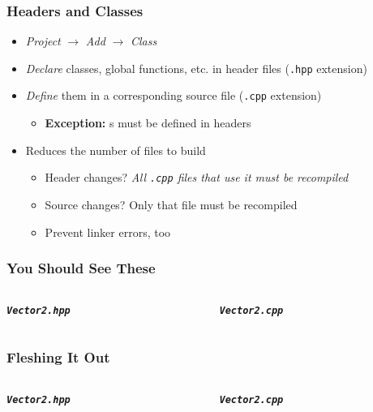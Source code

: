 \documentclass[glossy]{beamer}
\newcommand{\filename}[1]{\texttt{\textbf{\emph{#1}}}}
\begin{document}
\begin{frame}[fragile=singleslide]
  \frametitle{Headers and Classes}

  \begin{itemize}
    \item \emph{Project} $\rightarrow$ \emph{Add} $\rightarrow$ \emph{Class}
    \item \emph{Declare} classes, global functions, etc. in header files (\texttt{.hpp} extension)
    \item \emph{Define} them in a corresponding source file (\texttt{.cpp} extension)
    \begin{itemize}
      \item \textbf{Exception:} s must be defined in headers
    \end{itemize}
    \item Reduces the number of files to build
    \begin{itemize}
      \item Header changes? \emph{All \texttt{.cpp} files that use it must be recompiled}
      \item Source changes? Only that file must be recompiled
      \item Prevent linker errors, too
    \end{itemize}
  \end{itemize}
\end{frame}


\begin{frame}[fragile=singleslide]
  \frametitle{You Should See These}

  \begin{columns}[t]
    \begin{column}{6cm}
      \filename{Vector2.hpp}
    \end{column}

    \begin{column}{6cm}
      \filename{Vector2.cpp}
    \end{column}
  \end{columns}
\end{frame}


\begin{frame}[fragile=singleslide]
  \frametitle{Fleshing It Out}
  
  \begin{columns}[t]
    \begin{column}{5.5cm}
      \filename{Vector2.hpp}
    \end{column}

    \begin{column}{6cm}
      \filename{Vector2.cpp}
    \end{column}
  \end{columns}
\end{frame}
\end{document}
